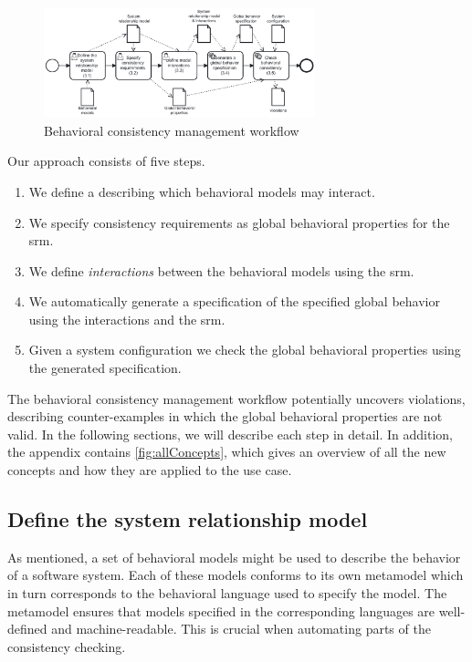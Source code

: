 \documentclass{jot}
\begin{document}
\begin{figure}[h]
    \centering
    \includegraphics[width=0.7\textwidth]{figures/workflow.pdf}
    \caption{Behavioral consistency management workflow}
    \label{fig:approach}
\end{figure}

Our approach consists of five steps.
\begin{enumerate}
    \item We define a \emph{} describing which behavioral models may interact.
    \item We specify consistency requirements as global behavioral properties for the \gls*{srm}.
    \item We define \emph{interactions} between the behavioral models using the \gls*{srm}.
    \item We automatically generate a specification of the specified global behavior using the interactions and the \gls*{srm}.
    \item Given a system configuration we check the global behavioral properties using the generated specification.
\end{enumerate}
The behavioral consistency management workflow potentially uncovers violations, describing counter-examples in which the global behavioral properties are not valid.
In the following sections, we will describe each step in detail.
In addition, the appendix contains \cref{fig:allConcepts}, which gives an overview of all the new concepts and how they are applied to the use case.


\subsection{Define the system relationship model}
As mentioned, a set of behavioral models might be used to describe the behavior of a software system.
Each of these models conforms to its own metamodel which in turn corresponds to the behavioral language used to specify the model.
The metamodel ensures that models specified in the corresponding languages are well-defined and machine-readable.
This is crucial when automating parts of the consistency checking.
\end{document}

